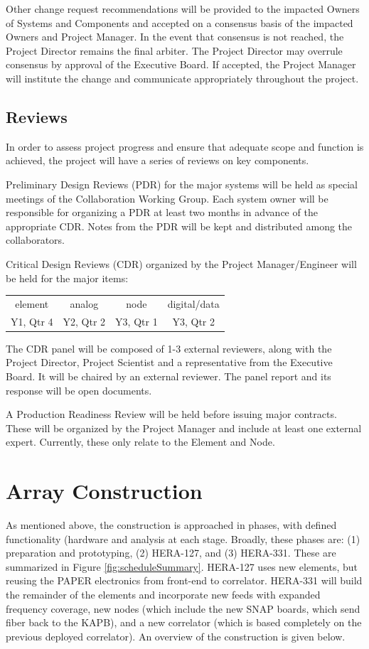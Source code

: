 \documentclass[preprint]{aastex}
\begin{document}
Other change request recommendations will be provided to the impacted Owners of Systems and
Components and accepted on a consensus basis of the impacted Owners and Project Manager.  
In the event that consensus is not reached, the Project Director remains the final arbiter.  The Project 
Director may overrule consensus by approval of the Executive Board.  If accepted, the Project Manager 
will institute the change and communicate appropriately throughout the project.

\subsection{Reviews}
\label{sec:reviews}
In order to assess project progress and ensure that adequate scope and function is achieved,
the project will have a series of reviews on key components.

Preliminary Design Reviews (PDR) for the major systems will be held as special meetings 
of the Collaboration Working Group.  Each system owner will be responsible for organizing
a PDR at least two months in advance of the appropriate CDR.  Notes from the PDR will be
kept and distributed among the collaborators.

Critical Design Reviews (CDR) organized by the Project Manager/Engineer will be 
held for the major items:  
\begin{tabular}{| c{1in} | c{1in} | c{1in} | c{1in} |} \hline
element  & analog & node & digital/data \tabularnewline
 Y1, Qtr 4 &  Y2, Qtr 2 & Y3, Qtr 1 &  Y3, Qtr 2 \tabularnewline \hline
\end{tabular}
\vspace{.1in}

The CDR panel will be composed of 1-3 external reviewers, along with the Project
Director, Project Scientist and a representative
from the Executive Board. It will be chaired by an external reviewer. The panel
report and its response will be open documents.

A Production Readiness Review will be held before issuing major contracts.  These will
be organized by the Project Manager and include at least one external expert.  Currently, these
only relate to the Element and Node.


\section{Array Construction}
\label{sec:construction}
As mentioned above, the construction is approached in phases, with defined functionality (hardware 
and analysis at each stage.  Broadly, these phases are:  (1) preparation and prototyping, (2) HERA-127, 
and (3) HERA-331.  These are summarized in Figure \ref{fig:scheduleSummary}.   HERA-127 uses new
elements, but reusing the PAPER electronics from front-end to correlator.  HERA-331 will build the 
remainder of the elements and incorporate new feeds with expanded frequency coverage, new nodes
(which include the new SNAP boards, which send fiber back to the KAPB), and a new correlator (which
is based completely on the previous deployed correlator).
An overview of the construction is given below.
\end{document}
